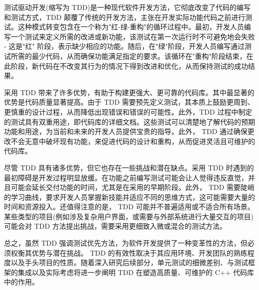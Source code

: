 测试驱动开发(缩写为 TDD)是一种现代软件开发方法，它彻底改变了代码的编写和测试方式，TDD 颠覆了传统的开发方法，主张在开发实际功能代码之前进行测试。这种模式转变包含在一个称为"红-绿-重构"的循环过程中。最初，开发人员编写一个测试来定义所需的改进或新功能，该测试在第一次运行时不可避免地会失败 - 这是"红" 阶段，表示缺少相应的功能。随后，在"绿"阶段，开发人员编写通过测试所需的最少代码，从而确保功能满足指定的要求。该循环在"重构"阶段结束，在此阶段，新代码在不改变其行为的情况下得到改进和优化，从而保持测试的成功结果。

采用 TDD 带来了许多优势，有助于构建更强大、更可靠的代码库。其中最显著的优势是代码质量显著提高。由于 TDD 需要预先定义测试，其本质上鼓励更周到、更慎重的设计过程，从而降低出现错误和错误的可能性。此外，TDD 过程中制定的测试具有双重用途，即代码库的详细文档。这些测试可以清楚地了解代码的预期功能和用途，为当前和未来的开发人员提供宝贵的指导。此外， TDD 通过确保更改不会无意中破坏现有功能，来促进代码的设计和重构，从而促进灵活且可维护的代码库。

尽管 TDD 具有诸多优势，但它也存在一些挑战和潜在缺点。采用 TDD 时遇到的最初障碍是开发过程明显放缓。在功能之前编写测试可能会让人觉得违反直觉，并且可能会延长交付功能的时间，尤其是在采用的早期阶段。此外， TDD 需要陡峭的学习曲线，要求开发人员掌握新技能并适应不同的思维方式，这可能需要大量的时间和资源投入。还值得注意的是， TDD 可能并不普遍适用或不适合所有场景。某些类型的项目(例如涉及复杂用户界面，或需要与外部系统进行大量交互的项目)可能会对 TDD 方法提出挑战，需要采用更细致入微或混合的测试方法。

总之，虽然 TDD 强调测试优先方法，为软件开发提供了一种变革性的方法，但必须权衡其优势与潜在挑战。 TDD 的有效性取决于其应用环境、开发团队的熟练程度以及手头项目的性质。随着深入研究后续部分，单元测试的细微差别、与测试框架的集成以及实际考虑将进一步阐明 TDD 在塑造高质量、可维护的 C++ 代码库中的作用。
